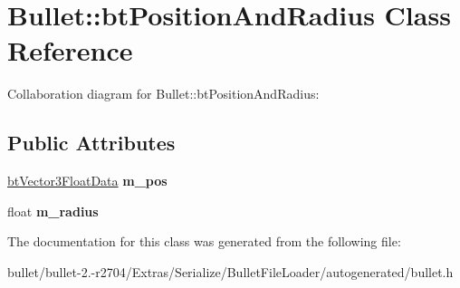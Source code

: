 \hypertarget{class_bullet_1_1bt_position_and_radius}{\section{Bullet\+:\+:bt\+Position\+And\+Radius Class Reference}
\label{class_bullet_1_1bt_position_and_radius}
}


Collaboration diagram for Bullet\+:\+:bt\+Position\+And\+Radius\+:
\subsection*{Public Attributes}
\begin{DoxyCompactItemize}
\item 
\hypertarget{class_bullet_1_1bt_position_and_radius_a67506759cfb0c8cad19f38fcae37377c}{\hyperlink{class_bullet_1_1bt_vector3_float_data}{bt\+Vector3\+Float\+Data} {\bfseries m\+\_\+pos}}\label{class_bullet_1_1bt_position_and_radius_a67506759cfb0c8cad19f38fcae37377c}

\item 
\hypertarget{class_bullet_1_1bt_position_and_radius_ac18261c1550915c41be34588a64e07ad}{float {\bfseries m\+\_\+radius}}\label{class_bullet_1_1bt_position_and_radius_ac18261c1550915c41be34588a64e07ad}

\end{DoxyCompactItemize}


The documentation for this class was generated from the following file\+:\begin{DoxyCompactItemize}
\item 
bullet/bullet-\/2.-\/r2704/\+Extras/\+Serialize/\+Bullet\+File\+Loader/autogenerated/bullet.\+h\end{DoxyCompactItemize}

